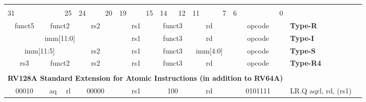 \documentclass{report}
\begin{document}
\begin{table}[p]
\begin{small}
\begin{center}
\begin{tabular}{p{0.05mm}p{0.05mm}p{0.05mm}p{0.05mm}p{0.05mm}p{0.05mm}p{0.05mm}p{0.05mm}p{0.05mm}p{0.05mm}p{0.05mm}p{0.05mm}p{0.05mm}p{0.05mm}p{0.05mm}p{0.05mm}p{0.05mm}p{0.05mm}p{0.05mm}p{0.05mm}p{0.05mm}p{0.05mm}p{0.05mm}p{0.05mm}p{0.05mm}p{0.05mm}p{0.05mm}p{0.05mm}p{0.05mm}p{0.05mm}p{0.05mm}p{0.05mm}p{50mm}l}& & & & & & & & & & & & & & & & & & & & & & & & & & & & & & & & & \\
\multicolumn{3}{l}{\scriptsize{31}} & \multicolumn{4}{r}{\scriptsize{25}} & \multicolumn{2}{l}{\scriptsize{24}} & \multicolumn{3}{r}{\scriptsize{20}} & \multicolumn{2}{l}{\scriptsize{19}} & \multicolumn{3}{r}{\scriptsize{15}} & \multicolumn{1}{l}{\scriptsize{14}} & \multicolumn{2}{r}{\scriptsize{12}} & \multicolumn{2}{l}{\scriptsize{11}} & \multicolumn{3}{r}{\scriptsize{7}} & \multicolumn{3}{l}{\scriptsize{6}} & \multicolumn{4}{r}{\scriptsize{0}} &  \\
\cline{1-32}
\multicolumn{5}{|c|}{funct5} & \multicolumn{2}{c|}{funct2} & \multicolumn{5}{c|}{rs2} & \multicolumn{5}{c|}{rs1} & \multicolumn{3}{c|}{funct3} & \multicolumn{5}{c|}{rd} & \multicolumn{7}{c|}{opcode} & \scriptsize{\bf Type-R} \\
\cline{1-32}
\multicolumn{12}{|c|}{imm[11:0]} & \multicolumn{5}{c|}{rs1} & \multicolumn{3}{c|}{funct3} & \multicolumn{5}{c|}{rd} & \multicolumn{7}{c|}{opcode} & \scriptsize{\bf Type-I} \\
\cline{1-32}
\multicolumn{7}{|c|}{imm[11:5]} & \multicolumn{5}{c|}{rs2} & \multicolumn{5}{c|}{rs1} & \multicolumn{3}{c|}{funct3} & \multicolumn{5}{c|}{imm[4:0]} & \multicolumn{7}{c|}{opcode} & \scriptsize{\bf Type-S} \\
\cline{1-32}
\multicolumn{5}{|c|}{rs3} & \multicolumn{2}{c|}{funct2} & \multicolumn{5}{c|}{rs2} & \multicolumn{5}{c|}{rs1} & \multicolumn{3}{c|}{funct3} & \multicolumn{5}{c|}{rd} & \multicolumn{7}{c|}{opcode} & \scriptsize{\bf Type-R4} \\
\cline{1-32}
\tabularnewline
\multicolumn{32}{c}{\bf RV128A Standard Extension for Atomic Instructions (in addition to RV64A) } & \\
\cline{1-32}
\multicolumn{5}{|c|}{00010} & \multicolumn{1}{c|}{aq} & \multicolumn{1}{c|}{rl} & \multicolumn{5}{c|}{00000} & \multicolumn{5}{c|}{rs1} & \multicolumn{3}{c|}{100} & \multicolumn{5}{c|}{rd} & \multicolumn{7}{c|}{0101111} & \scriptsize{LR.Q aqrl, rd, (rs1)} \\

\end{tabular}
\end{center}
\end{small}
\end{table}
\end{document}
